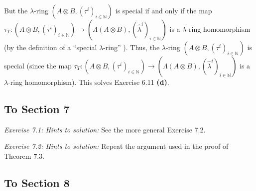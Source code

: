 \documentclass[numbers=enddot,12pt,final,onecolumn,notitlepage]{scrartcl}%
\begin{document}
But the $\lambda$-ring $\left(  A\otimes B,\left(  \tau^{i}\right)
_{i\in\mathbb{N}}\right)  $ is special if and only if the map $\tau
_{T}:\left(  A\otimes B,\left(  \tau^{i}\right)  _{i\in\mathbb{N}}\right)
\rightarrow\left(  \Lambda\left(  A\otimes B\right)  ,\left(  \widehat{\lambda
}^{i}\right)  _{i\in\mathbb{N}}\right)  $ is a $\lambda$-ring homomorphism (by
the definition of a \textquotedblleft special $\lambda$-ring\textquotedblright%
). Thus, the $\lambda$-ring $\left(  A\otimes B,\left(  \tau^{i}\right)
_{i\in\mathbb{N}}\right)  $ is special (since the map $\tau_{T}:\left(
A\otimes B,\left(  \tau^{i}\right)  _{i\in\mathbb{N}}\right)  \rightarrow
\left(  \Lambda\left(  A\otimes B\right)  ,\left(  \widehat{\lambda}%
^{i}\right)  _{i\in\mathbb{N}}\right)  $ is a $\lambda$-ring homomorphism).
This solves Exercise 6.11 \textbf{(d)}.

\subsection{To Section 7}

\textit{Exercise 7.1: Hints to solution:} See the more general Exercise 7.2.

\textit{Exercise 7.2: Hints to solution:} Repeat the argument used in the
proof of Theorem 7.3.

\subsection{To Section 8}
\end{document}
